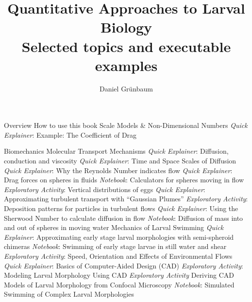 \documentclass[10pt,a4paper]{article}
\begin{document}
\def\QE{\textit{Quick Explainer}\xspace}
\def\NB{\textit{Notebook}\xspace}
\def\EA{\textit{Exploratory Activity}\xspace}
\def\MD{\textit{Modeling Description}\xspace}
	
\title{Quantitative Approaches to Larval Biology \\ {\Large Selected topics and executable examples}}
	
\author{Daniel Gr\"unbaum}
\maketitle
	
\begin{outline}[enumerate]
\1 Overview 
	\2 How to use this book
	\2 Scale Models \& Non-Dimensional Numbers
		\3 \QE: Example: The Coefficient of Drag
		
\1 Biomechanics
	\2 Molecular Transport Mechanisms
		\3 \QE: Diffusion, conduction and viscosity
		\3 \QE: Time and Space Scales of Diffusion
		\3 \QE: Why the Reynolds Number indicates flow
		\3 \QE: Drag forces on spheres in fluids
		\3 \NB: Calculators for spheres moving in flow
		\3 \EA: Vertical distributions of eggs 
		\3 \QE: Approximating turbulent transport with ``Gaussian Plumes''
		\3 \EA: Deposition patterns for particles in turbulent flows
		\3 \QE: Using the Sherwood Number to calculate diffusion in flow
		\3 \NB: Diffusion of mass into and out of spheres in moving water
	\2 Mechanics of Larval Swimming
		\3 \QE: Approximating early stage larval morphologies with semi-spheroid chimeras
		\3 \NB: Swimming of early stage larvae in still water and shear 
		\3 \EA: Speed, Orientation and Effects of Environmental Flows
		\3 \QE: Basics of Computer-Aided Design (CAD)
		\3 \EA: Modeling Larval Morphology Using CAD
		\3 \EA  Deriving CAD Models of Larval Morphology from Confocal Microscopy
		\3 \NB: Simulated Swimming of Complex Larval Morphologies
		

\end{outline}
\end{document}
